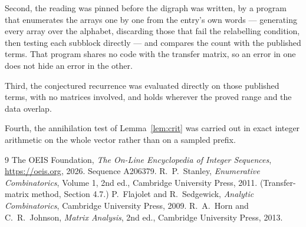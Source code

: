 \documentclass[11pt,a4paper]{article}
\theoremstyle{plain}
\theoremstyle{definition}
\begin{document}
Second, the reading was pinned before the digraph was written, by a program that enumerates
the arrays one by one from the entry's own words --- generating every array over the
alphabet, discarding those that fail the relabelling condition, then testing each subblock
directly --- and compares the count with the published terms. That program shares no code
with the transfer matrix, so an error in one does not hide an error in the other.

Third, the conjectured recurrence was evaluated directly on those published terms, with no
matrices involved, and holds wherever the proved range and the data overlap.

Fourth, the annihilation test of Lemma~\ref{lem:crit} was carried out in exact integer
arithmetic on the whole vector rather than on a sampled prefix.

\begin{thebibliography}{9}
 The OEIS Foundation, \emph{The On-Line Encyclopedia of Integer
Sequences}, \url{https://oeis.org}, 2026. Sequence A206379.
 R.~P.~Stanley, \emph{Enumerative Combinatorics}, Volume 1, 2nd ed.,
Cambridge University Press, 2011. (Transfer-matrix method, Section 4.7.)
 P.~Flajolet and R.~Sedgewick, \emph{Analytic Combinatorics}, Cambridge
University Press, 2009.
 R.~A.~Horn and C.~R.~Johnson, \emph{Matrix Analysis}, 2nd ed., Cambridge
University Press, 2013.
\end{thebibliography}
\end{document}
